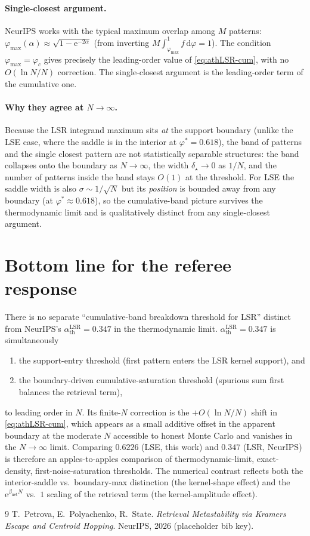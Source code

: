\documentclass[11pt]{article}
\newcommand{\Bnet}{\beta_{\mathrm{net}}}
\newcommand{\athLSR}{\alpha_{\mathrm{th}}^{\mathrm{LSR}}}
\begin{document}
\paragraph{Single-closest argument.}
NeurIPS works with the typical maximum overlap among $M$ patterns:
$\varphi_{\max}(\alpha) \approx \sqrt{1 - \mathrm{e}^{-2\alpha}}$ (from
inverting $M \int_{\varphi_{\max}}^{1} f \, \mathrm{d}\varphi = 1$). The
condition $\varphi_{\max} = \varphi_c$ gives precisely the leading-order
value of \eqref{eq:athLSR-cum}, with no $O(\ln N / N)$ correction. The
single-closest argument is the leading-order term of the cumulative one.

\paragraph{Why they agree at $N \to \infty$.}
Because the LSR integrand maximum sits \emph{at} the support boundary
(unlike the LSE case, where the saddle is in the interior at
$\varphi^{*} = 0.618$), the band of patterns and the single closest pattern
are not statistically separable structures: the band collapses onto the
boundary as $N \to \infty$, the width $\delta_{\star} \to 0$ as $1/N$, and
the number of patterns inside the band stays $O(1)$ at the threshold.
For LSE the saddle width is also $\sigma \sim 1/\sqrt{N}$ but its
\emph{position} is bounded away from any boundary (at $\varphi^{*} \approx 0.618$),
so the cumulative-band picture survives the thermodynamic limit and is
qualitatively distinct from any single-closest argument.

\section{Bottom line for the referee response}

There is no separate ``cumulative-band breakdown threshold for LSR''
distinct from NeurIPS's $\athLSR = 0.347$ in the thermodynamic limit.
$\athLSR = 0.347$ is simultaneously
\begin{enumerate}
  \item the support-entry threshold (first pattern enters the LSR kernel
        support), and
  \item the boundary-driven cumulative-saturation threshold (spurious sum
        first balances the retrieval term),
\end{enumerate}
to leading order in $N$. Its finite-$N$ correction is the $+ O(\ln N / N)$
shift in \eqref{eq:athLSR-cum}, which appears as a small additive offset
in the apparent boundary at the moderate $N$ accessible to honest Monte
Carlo and vanishes in the $N \to \infty$ limit. Comparing $0.6226$ (LSE,
this work) and $0.347$ (LSR, NeurIPS) is therefore an apples-to-apples
comparison of thermodynamic-limit, exact-density, first-noise-saturation
thresholds. The numerical contrast reflects both the interior-saddle vs.\
boundary-max distinction (the kernel-shape effect) and the
$\mathrm{e}^{\Bnet N}$ vs.\ $1$ scaling of the retrieval term (the
kernel-amplitude effect).

\begin{thebibliography}{9}
T.\ Petrova, E.\ Polyachenko, R.\ State.
\emph{Retrieval Metastability via Kramers Escape and Centroid Hopping}.
NeurIPS, 2026 (placeholder bib key).
\end{thebibliography}
\end{document}
